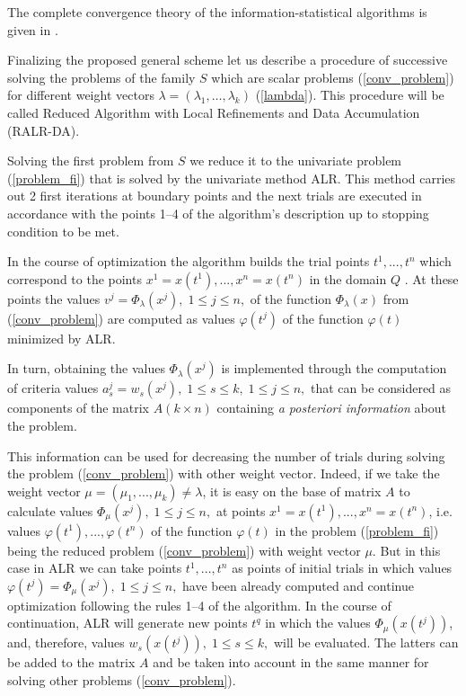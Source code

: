 \documentclass[runningheads]{llncs}
\begin{document}
The complete convergence theory of the information-statistical algorithms is given in \cite{Strongin2000,Sergeyev2013}.

Finalizing the proposed general scheme  let us describe a procedure  of successive solving the problems of the family $S$ which are scalar problems (\ref{conv_problem}) for different weight vectors $\lambda = (\lambda_1, \dots,\lambda_k)$ (\ref{lambda}). This procedure will be called Reduced Algorithm with Local Refinements and Data Accumulation (RALR-DA).





Solving the first problem from $S$ we reduce it to the univariate problem (\ref{problem_fi}) that is solved by the univariate method ALR. This method carries out 2 first iterations at boundary points and the next trials are executed in accordance with the points 1--4 of the algorithm's description up to stopping condition to be met.

In the course of optimization the algorithm builds the trial points $t^1,...,t^n$ which correspond to the points $x^1 = x(t^1),...,x^n=x(t^n)$ in the domain $Q$ . At these points the values $v^j = \Phi_\lambda(x^j), \; 1 \leq j \leq n,$ of the function $\Phi_\lambda(x)$ from (\ref{conv_problem}) are computed as values $\varphi(t^j)$ of the function $\varphi(t)$  minimized by ALR.

In turn, obtaining the values $\Phi_\lambda(x^j)$  is implemented through the computation of criteria values $a_s^j = w_s(x^j), \; 1 \leq s \leq k, \; 1 \leq j \leq n,$  that can be considered as components of the matrix $A(k \times n)$ containing \textit{a posteriori information} about the problem.

This information can be used for decreasing the number of trials during solving the problem (\ref{conv_problem}) with other weight vector. Indeed, if we take the weight vector $\mu = (\mu_1,...,\mu_k) \neq \lambda$, it is easy on the base of matrix $A$ to calculate values $\Phi_\mu(x^j), \; 1 \leq j \leq n,$ at points $x^1 = x(t^1),...,x^n=x(t^n)$, i.e. values $\varphi(t^1),...,\varphi(t^n)$ of the function $\varphi(t)$ in the problem (\ref{problem_fi}) being the reduced problem (\ref{conv_problem}) with weight vector $\mu$. But in this case in ALR we can take points $t^1,...,t^n$ as points of initial trials in which values $ \varphi(t^j) = \Phi_\mu(x^j), \; 1 \leq j \leq n,$ have been already computed and continue optimization following the rules 1--4 of the algorithm. In the course of continuation, ALR will generate new points $t^q$ in which the values $\Phi_\mu(x(t^j))$, and, therefore, values $w_s(x(t^j)), \; 1 \leq s \leq k,$ will be evaluated. The latters can be added to the matrix $A$ and be taken into account in the same manner for solving other problems (\ref{conv_problem}). 
\end{document}
